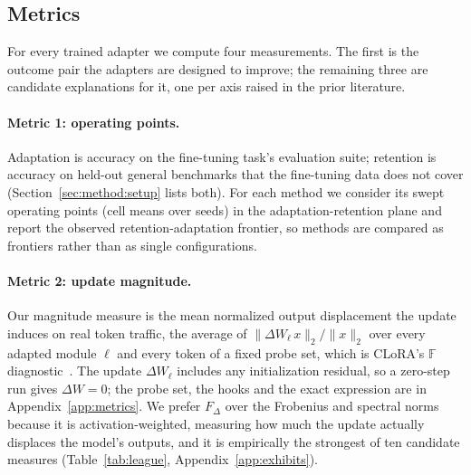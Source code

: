 \documentclass[11pt]{article}
\newcommand{\dw}{F_{\Delta}}
\begin{document}
\subsection{Metrics}\label{sec:method:metrics}
For every trained adapter we compute four measurements. The first is the
outcome pair the adapters are designed to improve; the remaining three are
candidate explanations for it, one per axis raised in the prior literature.

\paragraph{Metric 1: operating points.} Adaptation is
accuracy on the fine-tuning task's evaluation suite; retention is accuracy on
held-out general benchmarks that the fine-tuning data does not cover
(Section~\ref{sec:method:setup} lists both). For each method we consider its
swept operating points (cell means over seeds) in the adaptation-retention
plane and report the observed retention-adaptation frontier, so methods are
compared as frontiers rather than as single configurations.

\paragraph{Metric 2: update magnitude.} Our magnitude measure is the mean
normalized output displacement the update induces on real token traffic, the
average of $\lVert \Delta W_\ell\, x \rVert_2 / \lVert x \rVert_2$ over every
adapted module $\ell$ and every token of a fixed probe set, which is CLoRA's
$\mathbb{F}$ diagnostic~\citep{clora}. The update $\Delta W_\ell$ includes any
initialization residual, so a zero-step run gives $\Delta W = 0$; the probe set,
the hooks and the exact expression are in Appendix~\ref{app:metrics}. We prefer
$\dw$ over the Frobenius and spectral norms because it is activation-weighted,
measuring how much the update actually displaces the model's outputs, and it is
empirically the strongest of ten candidate measures
(Table~\ref{tab:league}, Appendix~\ref{app:exhibits}).
\end{document}
